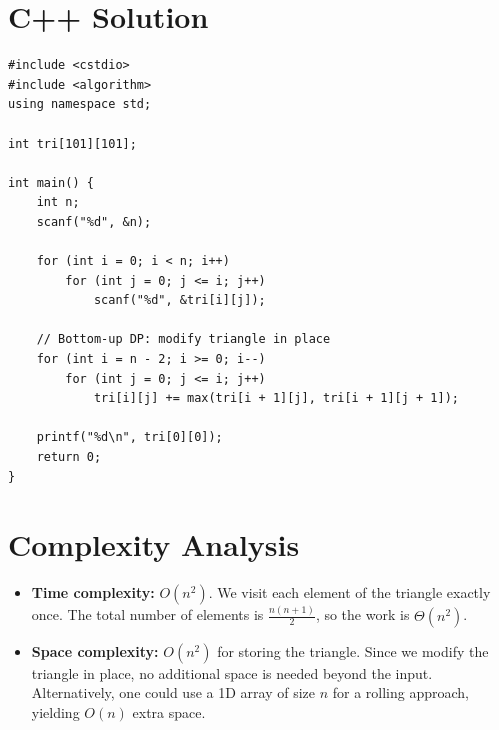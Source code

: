 \documentclass[11pt,a4paper]{article}
\begin{document}
\section{C++ Solution}

\begin{lstlisting}
#include <cstdio>
#include <algorithm>
using namespace std;

int tri[101][101];

int main() {
    int n;
    scanf("%d", &n);

    for (int i = 0; i < n; i++)
        for (int j = 0; j <= i; j++)
            scanf("%d", &tri[i][j]);

    // Bottom-up DP: modify triangle in place
    for (int i = n - 2; i >= 0; i--)
        for (int j = 0; j <= i; j++)
            tri[i][j] += max(tri[i + 1][j], tri[i + 1][j + 1]);

    printf("%d\n", tri[0][0]);
    return 0;
}
\end{lstlisting}

\section{Complexity Analysis}

\begin{itemize}
  \item \textbf{Time complexity:} $O(n^2)$. We visit each element of the triangle exactly once.
        The total number of elements is $\frac{n(n+1)}{2}$, so the work is $\Theta(n^2)$.
  \item \textbf{Space complexity:} $O(n^2)$ for storing the triangle. Since we modify the
        triangle in place, no additional space is needed beyond the input.
        Alternatively, one could use a 1D array of size $n$ for a rolling approach,
        yielding $O(n)$ extra space.
\end{itemize}
\end{document}
